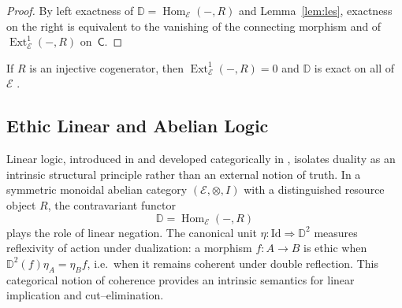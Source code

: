 \documentclass[12pt]{article}
\newcommand{\E}{\mathcal{E}}
\newcommand{\DD}{\mathbb{D}}
\newcommand{\Hom}{\operatorname{Hom}}
\newcommand{\Ext}{\operatorname{Ext}}
\theoremstyle{plain}
\newtheorem{proposition}[theorem]{Proposition}
\theoremstyle{definition}
\newtheorem{definition}[theorem]{Definition}
\theoremstyle{remark}
\numberwithin{equation}{section}
\begin{document}
\begin{proof}
By left exactness of $\DD=\Hom_\E(-,R)$ and Lemma~\ref{lem:les}, exactness on the right is equivalent to the vanishing of the connecting morphism and of $\Ext^1_\E(-,R)$ on~$\mathsf{C}$.
\end{proof}

If \(R\) is an injective cogenerator, then \(\Ext^1_{\E}(-,R)=0\) and \(\DD\) is exact on all of \(\E\) \cite{Weibel1994}.




\subsection{Ethic Linear and Abelian Logic} \label{sec:step5}

Linear logic, introduced in \cite{Girard1987} and developed categorically in \cite{Barr1979,Kelly1982}, isolates duality as an intrinsic structural principle rather than an external notion of truth.  In a symmetric monoidal abelian category $(\E,\otimes,I)$ with a distinguished resource object $R$, the contravariant functor
\[
\mathbb D=\Hom_\E(-,R)
\]
plays the role of linear negation.  The canonical unit $\eta:\mathrm{Id}\Rightarrow \mathbb D^2$ measures reflexivity of action under dualization: a morphism $f:A\to B$ is ethic when $\mathbb D^2(f)\eta_A=\eta_B f$, i.e.\ when it remains coherent under double reflection.  This categorical notion of coherence provides an intrinsic semantics for linear implication and cut--elimination.
\end{document}
